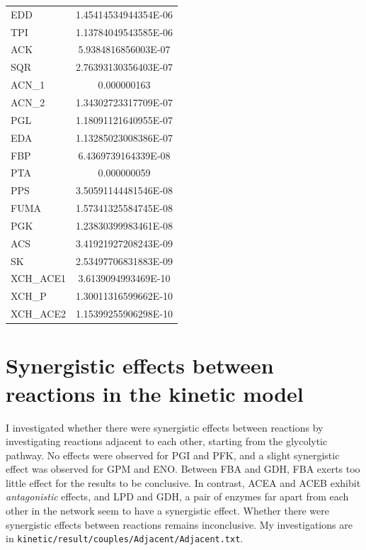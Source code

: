 \documentclass[parskip=full, numbers=noenddot]{scrreprt}
\begin{document}
\begin{longtable}{lS}
EDD & 1.45414534944354E-06\\
TPI & 1.13784049543585E-06\\
ACK & 5.9384816856003E-07\\
SQR & 2.76393130356403E-07\\
ACN\_1 & 0.000000163\\
ACN\_2 & 1.34302723317709E-07\\
PGL & 1.18091121640955E-07\\
EDA & 1.13285023008386E-07\\
FBP & 6.4369739164339E-08\\
PTA & 0.000000059\\
PPS & 3.50591144481546E-08\\
FUMA & 1.57341325584745E-08\\
PGK & 1.23830399983461E-08\\
ACS & 3.41921927208243E-09\\
SK & 2.53497706831883E-09\\
XCH\_ACE1 & 3.6139094993469E-10\\
XCH\_P & 1.30011316599662E-10\\
XCH\_ACE2 & 1.15399255906298E-10\\
\bottomrule
\end{longtable}

\section{Synergistic effects between reactions in the kinetic model}
\label{ap:synergistic}

I investigated whether there were synergistic effects between reactions by investigating reactions adjacent to each other, starting from the glycolytic pathway. No effects were observed for PGI and PFK, and a slight synergistic effect was observed for GPM and ENO. Between FBA and GDH, FBA exerts too little effect for the results to be conclusive. In contrast, ACEA and ACEB exhibit \emph{antagonistic} effects, and LPD and GDH, a pair of enzymes far apart from each other in the network seem to have a synergistic effect. Whether there were synergistic effects between reactions remains inconclusive. My investigations are in \texttt{kinetic/result/couples/Adjacent/Adjacent.txt}.

\printbibliography
\end{document}
